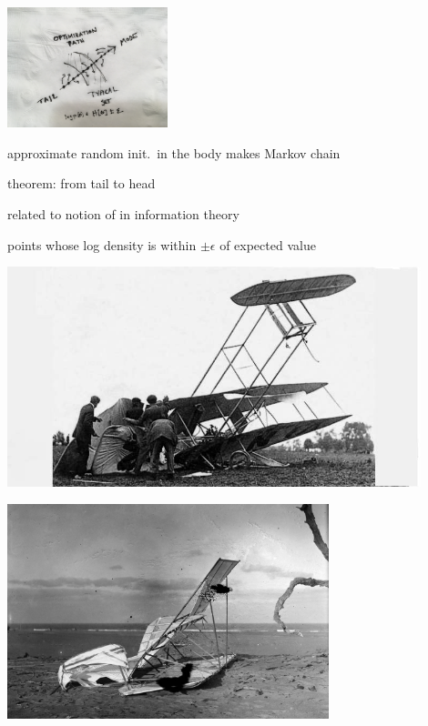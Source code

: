 \documentclass[9pt]{report}
\begin{document}
\vspace*{-2pt}
\begin{center}
  \includegraphics[width=0.35\textwidth]{img/napkin-adapt.jpg}
\end{center}
\vspace*{-4pt}
\begin{subitemize}
\item approximate random init.\ in the body makes Markov chain 
\item {} theorem:  from tail  to head
\item related to notion of  in information theory
  \begin{subitemize}
  \item points whose log density is within $\pm \epsilon$ of expected value
  \end{subitemize}
\end{subitemize}

\begin{center}
  \includegraphics[width=0.9\textwidth]{img/wright-crash.jpg}
\end{center}

\begin{center}
  \includegraphics[width=0.7\textwidth]{img/wright-crash-2.jpg}
\end{center}
\end{document}
